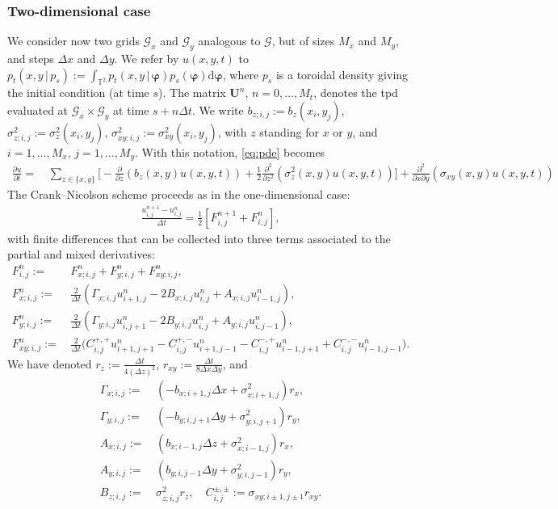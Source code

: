 \documentclass[oneside,11pt]{article}
\newcommand{\T}{\mathbb{T}}
\newcommand{\rd}{\mathrm{d}}
\newcommand{\bU}{\mathbf{U}}
\newcommand{\bphi}{\boldsymbol\varphi}
\newcommand{\lrp}[1]{\left(#1\right)}
\newcommand{\lrc}[1]{\left[#1\right]}
\newcommand{\pf}[2]{\frac{\partial #1}{\partial #2}}
\newcommand{\pftwo}[2]{\frac{\partial^2 #1}{\partial #2^2}}
\newcommand{\pfmix}[3]{\frac{\partial^2 #1}{\partial #2\partial #3}}
\begin{document}
\subsubsection{Two-dimensional case}

We consider now two grids $\mathcal{G}_x$ and $\mathcal{G}_y$ analogous to $\mathcal{G}$, but of sizes $M_x$ and $M_y$, and steps $\Delta x$ and $\Delta y$. We refer by $u(x,y,t)$ to $p_t(x,y\,|\,p_s):=\int_{\T^2}p_t(x,y\,|\,\bphi)p_s(\bphi)\rd\bphi$, where $p_s$ is a toroidal density giving the initial condition (at time $s$). The matrix $\bU^n$,
$n=0,\ldots,{M_t}$, denotes the tpd evaluated at $\mathcal{G}_x\times\mathcal{G}_y$ at time $s+n\Delta t$. We write $b_{z;i,j}:=b_z(x_i,y_j)$, $\sigma_{z;i,j}^2:=\sigma_z^2(x_i,y_j)$, $\sigma_{xy;i,j}^2:=\sigma_{xy}^2(x_i,y_j)$, with $z$ standing for $x$ or $y$, and $i=1,\ldots,M_x$, $j=1,\ldots,M_y$. With this notation, \eqref{eq:pde} becomes
\begin{align*}
\pf{u}{t}=&\,\sum_{z\in\{x,y\}}\Big[-\pf{}{z}(b_z(x,y)u(x,y,t))+\frac{1}{2}\pftwo{}{z}(\sigma_z^2(x,y)u(x,y,t))\Big]+\pfmix{}{x}{y}(\sigma_{xy}(x,y)u(x,y,t))
\end{align*}
The Crank--Nicolson scheme proceeds as in the one-dimensional case:
\begin{align}
\frac{u_{i,j}^{n+1}-u_{i,j}^{n}}{\Delta t}=\frac{1}{2}\lrc{F_{i,j}^{n+1}+F_{i,j}^{n}},\label{eq:us}
\end{align}
with finite differences that can be collected into three terms associated to the partial and mixed derivatives:
\begin{align*}
F_{i,j}^{n}:=&\,F^n_{x;i,j}+F^n_{y;i,j}+F^n_{xy;i,j},\\
F^n_{x;i,j}:=&\,\frac{2}{\Delta t}\lrp{\Gamma_{x;i,j} u_{i+1,j}^{n}-2B_{x;i,j} u_{i,j}^{n}+A_{x;i,j} u_{i-1,j}^{n}},\\
F^n_{y;i,j}:=&\,\frac{2}{\Delta t}\lrp{\Gamma_{y;i,j} u_{i,j+1}^{n}-2B_{y;i,j} u_{i,j}^{n}+A_{y;i,j} u_{i,j-1}^{n}},\\
F^n_{xy;i,j}:=&\,\frac{2}{\Delta t}\big(C^{+,+}_{i,j} u_{i+1,j+1}^{n}-C^{+,-}_{i,j} u_{i+1,j-1}^{n} -C^{-,+}_{i,j} u_{i-1,j+1}^{n}+C^{-,-}_{i,j} u_{i-1,j-1}^{n}\big).
\end{align*}
We have denoted $r_z:=\frac{\Delta t}{4(\Delta z)^2}$, $r_{xy}:=\frac{\Delta t}{8\Delta x\Delta y}$, and
\begin{align*}
\Gamma_{x;i,j}:=&\,(-b_{x;i+1,j}\Delta x+\sigma^2_{x;i+1,j})r_x,\\
\Gamma_{y;i,j}:=&\,(-b_{y;i,j+1}\Delta y+\sigma^2_{y;i,j+1})r_y,\\
A_{x;i,j}:=&\,(b_{x;i-1,j}\Delta z+\sigma^2_{x;i-1,j})r_x,\\
A_{y;i,j}:=&\,(b_{y;i,j-1}\Delta y+\sigma^2_{y;i,j-1})r_y,\\
B_{z;i,j}:=&\,\sigma^2_{z;i,j}r_z,\quad C^{\pm,\pm}_{i,j}:=\sigma_{xy;i\pm1,j\pm1}r_{xy}.
\end{align*}
\end{document}
